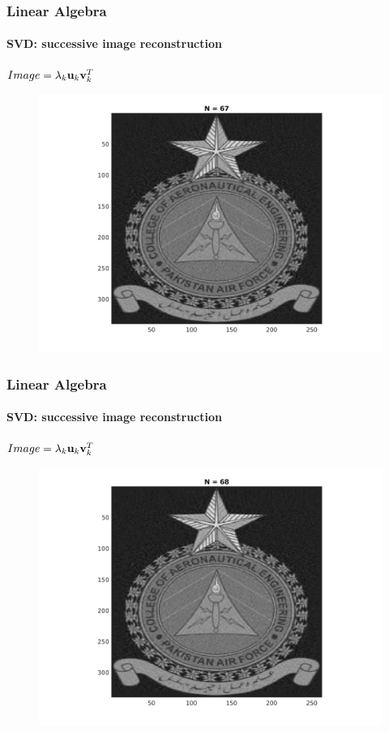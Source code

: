 \documentclass[hyperref={pdfpagelabels=true}]{beamer}
\begin{document}
\begin{frame}
\frametitle{Linear Algebra}
\framesubtitle{SVD: successive image reconstruction} 
\small{
\begin{center}
$Image = \lambda_k{\bf u}_k {\bf v}_k^T$
\end{center}}
\begin{figure}[!htb]
\centering
\includegraphics [scale=0.48]{n/b67.png}
\end{figure}
\end{frame}

\begin{frame}
\frametitle{Linear Algebra}
\framesubtitle{SVD: successive image reconstruction} 
\small{
\begin{center}
$Image = \lambda_k{\bf u}_k {\bf v}_k^T$
\end{center}}
\begin{figure}[!htb]
\centering
\includegraphics [scale=0.48]{n/b68.png}
\end{figure}
\end{frame}
\end{document}
